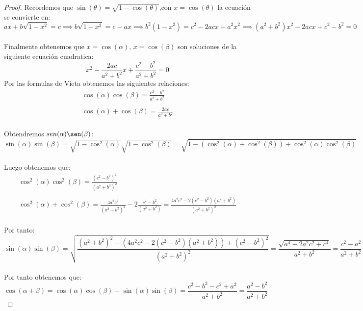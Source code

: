 \documentclass[11pt,letterpaper]{article}
\begin{document}
\begin{proof}
    Recordemos que $\sin(\theta)=\sqrt{1-\cos(\theta)}$,con $x=\cos(\theta)$ la ecuaci\'on se convierte en:\,\\
    \begin{equation*}
        ax+b\sqrt{1-x^2}=c\implies b\sqrt{1-x^2}=c-ax\implies b^2(1-x^2)=c^2-2acx+a^2x^2\implies (a^2+b^2)x^2-2acx+c^2-b^2=0
    \end{equation*}\,\\
    Finalmente obtenemos que $x=\cos(\alpha)$, $x=\cos(\beta)$ son soluciones de la siguiente ecuaci\'on cuadratica:\,\\
    \begin{equation*}
        x^2-\frac{2ac}{a^2+b^2}x+\frac{c^2-b^2}{a^2+b^2}=0
    \end{equation*}
    Por las formulas de Vieta obtenemos las siguientes relaciones:\,\\
    \begin{align*}
        \cos(\alpha)\cos(\beta)=\frac{c^2-b^2}{a^2+b^2}\,\\
        \,\\
        \cos(\alpha)+\cos(\beta)=\frac{2ac}{a^2+b^2}
    \end{align*}\,\\
    Obtendremos $sen(\alpha)\sen(\beta)$:\,\\
    \begin{equation*}
        \sin(\alpha)\sin(\beta)=\sqrt{1-\cos^2(\alpha)}\sqrt{1-\cos^2(\beta)}=\sqrt{1-(\cos^2(\alpha)+\cos^2(\beta))+\cos^2(\alpha)\cos^2(\beta)}
    \end{equation*}\,\\
    Luego obtenemos que:\,\\
    \begin{align*}
        \cos^2(\alpha)\cos^2(\beta)=\frac{(c^2-b^2)^2}{(a^2+b^2)^2}\,\\
        \,\\
        \cos^2(\alpha)+\cos^2(\beta)=\frac{4a^2c^2}{(a^2+b^2)^2}-2\frac{c^2-b^2}{(a^2+b^2)}=\frac{4a^2c^2-2(c^2-b^2)(a^2+b^2)}{(a^2+b^2)^2}
    \end{align*}\,\\
    Por tanto:\,\\
    \begin{equation*}
        \sin(\alpha)\sin(\beta)=\sqrt{\frac{(a^2+b^2)^2-(4a^2c^2-2(c^2-b^2)(a^2+b^2))+(c^2-b^2)^2}{(a^2+b^2)^2}}=\frac{\sqrt{a^4-2a^2c^2+c^4}}{a^2+b^2}=\frac{c^2-a^2}{a^2+b^2}
    \end{equation*}\,\\
    Por tanto obtenemos que:\,\\
    \begin{equation*}
        \cos(\alpha+\beta)=\cos(\alpha)\cos(\beta)-\sin(\alpha)\sin(\beta)=\frac{c^2-b^2-c^2+a^2}{a^2+b^2}=\frac{a^2-b^2}{a^2+b^2}
    \end{equation*}
\end{proof}
\end{document}
